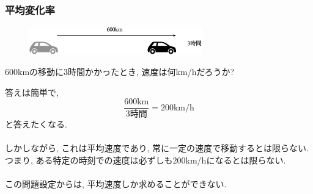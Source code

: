 \begin{frame}
\frametitle{平均変化率}

\vspace{-5mm}

 \begin{figure}[htbp]
 \begin{center} 
  \includegraphics[width=75mm]{calculus4/600km.png}
 \end{center}
\end{figure}

\vspace{-5mm}

\begin{Prob}
$600$kmの移動に$3$時間かかったとき, 速度は何km/hだろうか?
\end{Prob}

答えは簡単で, 
$$
\frac{\text{$600$km}}{\text{$3$時間}}=200\text{km/h}
$$
と答えたくなる. \\
\ \\

しかしながら, これは平均速度であり, 常に一定の速度で移動するとは限らない. 
つまり, ある特定の時刻での速度は必ずしも$200$km/hになるとは限らない. \\
\ \\

この問題設定からは, 平均速度しか求めることができない. 

\end{frame}







